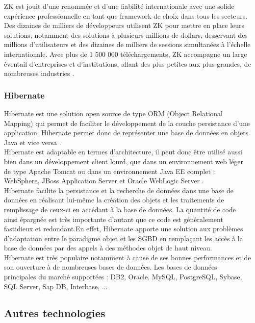 ZK est jouit d'une renommée et d'une fiabilité internationale avec une solide expérience professionnelle en tant que framework de choix dans tous les secteurs. Des dizaines de milliers de développeurs utilisent ZK pour mettre en place leurs solutions, notamment des solutions à plusieurs millions de dollars, desservant des millions d'utilisateurs et des dizaines de milliers de sessions simultanées à l'échelle internationale. Avec plus de 1 500 000 téléchargements, ZK accompagne un large éventail d'entreprises et d'institutions, allant des plus petites aux plus grandes, de nombreuses industries \cite{zk-use}.
\subsubsection{Hibernate}
Hibernate est une solution open source de type ORM (Object Relational Mapping) qui permet de faciliter le développement de la couche persistance d'une application. Hibernate permet donc de représenter une base de données en objets Java et vice versa \cite{hbnt-jmdoudoux}. \\
Hibernate est adaptable en termes d'architecture, il peut donc être utilisé aussi bien dans un développement client lourd, que dans un environnement web léger de type Apache Tomcat ou dans un environnement Java EE complet : WebSphere, JBoss Application Server et Oracle WebLogic Server \cite{hbnt}. \\
Hibernate facilite la persistance et la recherche de données dans une base de données en réalisant lui-même la création des objets et les traitements de remplissage de ceux-ci en accédant à la base de données. La quantité de code ainsi épargnée est très importante d'autant que ce code est généralement fastidieux et redondant.En effet, Hibernate apporte une solution aux problèmes d'adaptation entre le paradigme objet et les SGBD en remplaçant les accès à la base de données par des appels à des méthodes objet de haut niveau. \\
Hibernate est très populaire notamment à cause de ses bonnes performances et de son ouverture à de nombreuses bases de données. Les bases de données principales du marché supportées : DB2, Oracle, MySQL, PostgreSQL, Sybase, SQL Server, Sap DB, Interbase, ...
\subsection{Autres technologies}
